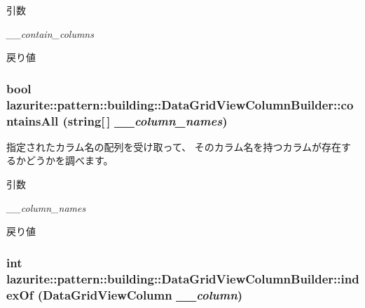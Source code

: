 \begin{DoxyParams}{引数}
\item[{\em \_\-\_\-contain\_\-columns}]\end{DoxyParams}
\begin{DoxyReturn}{戻り値}

\end{DoxyReturn}
\hypertarget{classlazurite_1_1pattern_1_1building_1_1_data_grid_view_column_builder_a126f1056d51b42976f2c6399e00a5c46}{
\subsubsection[{containsAll}]{\setlength{\rightskip}{0pt plus 5cm}bool lazurite::pattern::building::DataGridViewColumnBuilder::containsAll (string\mbox{[}$\,$\mbox{]} {\em \_\-\_\-column\_\-names})}}
\label{classlazurite_1_1pattern_1_1building_1_1_data_grid_view_column_builder_a126f1056d51b42976f2c6399e00a5c46}


指定されたカラム名の配列を受け取って、 そのカラム名を持つカラムが存在するかどうかを調べます。 
\begin{DoxyParams}{引数}
\item[{\em \_\-\_\-column\_\-names}]\end{DoxyParams}
\begin{DoxyReturn}{戻り値}

\end{DoxyReturn}
\hypertarget{classlazurite_1_1pattern_1_1building_1_1_data_grid_view_column_builder_a506f5c9d3ee2696b8b70efd81da64e0a}{
\subsubsection[{indexOf}]{\setlength{\rightskip}{0pt plus 5cm}int lazurite::pattern::building::DataGridViewColumnBuilder::indexOf (DataGridViewColumn {\em \_\-\_\-column})}}
\label{classlazurite_1_1pattern_1_1building_1_1_data_grid_view_column_builder_a506f5c9d3ee2696b8b70efd81da64e0a}


